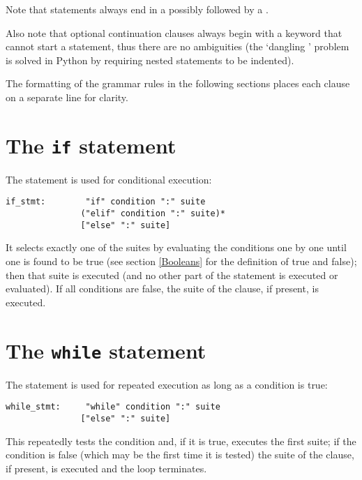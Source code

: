 Note that statements always end in a \verb@NEWLINE@ possibly followed
by a \verb@DEDENT@.

Also note that optional continuation clauses always begin with a
keyword that cannot start a statement, thus there are no ambiguities
(the `dangling \verb@else@' problem is solved in Python by requiring
nested \verb@if@ statements to be indented).

The formatting of the grammar rules in the following sections places
each clause on a separate line for clarity.

\section{The {\tt if} statement}

The \verb@if@ statement is used for conditional execution:

\begin{verbatim}
if_stmt:        "if" condition ":" suite
               ("elif" condition ":" suite)*
               ["else" ":" suite]
\end{verbatim}

It selects exactly one of the suites by evaluating the conditions one
by one until one is found to be true (see section \ref{Booleans} for
the definition of true and false); then that suite is executed (and no
other part of the \verb@if@ statement is executed or evaluated).  If
all conditions are false, the suite of the \verb@else@ clause, if
present, is executed.

\section{The {\tt while} statement}

The \verb@while@ statement is used for repeated execution as long as a
condition is true:

\begin{verbatim}
while_stmt:     "while" condition ":" suite
               ["else" ":" suite]
\end{verbatim}

This repeatedly tests the condition and, if it is true, executes the
first suite; if the condition is false (which may be the first time it
is tested) the suite of the \verb@else@ clause, if present, is
executed and the loop terminates.

